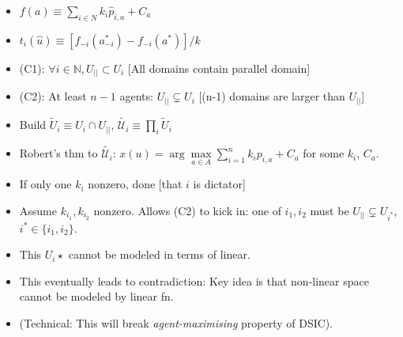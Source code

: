 \documentclass{article}
\begin{document}
\begin{itemize}
\item $f(a) \equiv \sum_{i \in N} k_i \hat p_{i, a} + C_a$
\item $t_i(\hat u) \equiv [f_{-i}(a_{-i}^*) - f_{-i}(a^*)]/k$
\end{itemize}


\begin{itemize}
    \item (C1): $\forall i \in \mathbb N, U_{||} \subset U_i$ [All domains contain parallel domain]
    \item (C2): At least $n-1$ agents: $U_{||} \subsetneq U_i$ [(n-1) domains are larger than $U_{||}$]
    \item Build $\tilde U_i \equiv U_i \cap U_{||}$, $\tilde {\mathcal U_i} \equiv \prod_i \tilde U_i$
    \item Robert's thm to $\tilde{ \mathcal U_i}$: $x(u) = \arg \underset{ a \in A}{\max} \sum_{i=1}^n k_i p_{i, a} + C_a$
          for some $k_i$, $C_a$.
    \item If only one $k_i$ nonzero, done [that $i$ is dictator]
    \item Assume $k_{i_1}, k_{i_2}$ nonzero. Allows (C2) to kick in: one of $i_1, i_2$
        must be $U_{||} \subsetneq U_{i^*}$, $i^* \in \{i_1, i_2\}$.
    \item This $U_i\star$ cannot be modeled in terms of linear.
    \item This eventually leads to contradiction: Key idea is that non-linear space
          cannot be modeled by linear fn.
    \item (Technical: This will break \emph{agent-maximising} property of DSIC).
\end{itemize}
\end{document}
